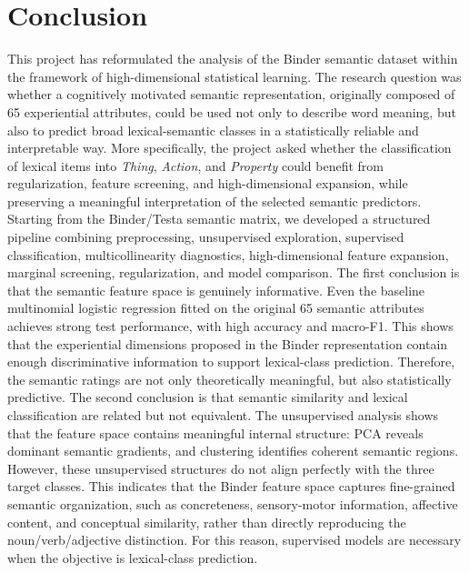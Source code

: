 \documentclass{ipgpmaster}
\begin{document}
\vspace{0.5cm}

\section{Conclusion}
\label{sec:conclusion}


This project has reformulated the analysis of the Binder semantic dataset within the framework of high-dimensional statistical learning. The research question was whether a cognitively motivated semantic representation, originally composed of 65 experiential attributes, could be used not only to describe word meaning, but also to predict broad lexical-semantic classes in a statistically reliable and interpretable way. More specifically, the project asked whether the classification of lexical items into \emph{Thing}, \emph{Action}, and \emph{Property} could benefit from regularization, feature screening, and high-dimensional expansion, while preserving a meaningful interpretation of the selected semantic predictors.
Starting from the Binder/Testa semantic matrix, we developed a structured pipeline combining preprocessing, unsupervised exploration, supervised classification, multicollinearity diagnostics, high-dimensional feature expansion, marginal screening, regularization, and model comparison. The first conclusion is that the semantic feature space is genuinely informative. Even the baseline multinomial logistic regression fitted on the original 65 semantic attributes achieves strong test performance, with high accuracy and macro-F1. This shows that the experiential dimensions proposed in the Binder representation contain enough discriminative information to support lexical-class prediction. Therefore, the semantic ratings are not only theoretically meaningful, but also statistically predictive.
The second conclusion is that semantic similarity and lexical classification are related but not equivalent. The unsupervised analysis shows that the feature space contains meaningful internal structure: PCA reveals dominant semantic gradients, and clustering identifies coherent semantic regions. However, these unsupervised structures do not align perfectly with the three target classes. This indicates that the Binder feature space captures fine-grained semantic organization, such as concreteness, sensory-motor information, affective content, and conceptual similarity, rather than directly reproducing the noun/verb/adjective distinction. For this reason, supervised models are necessary when the objective is lexical-class prediction.
\end{document}
